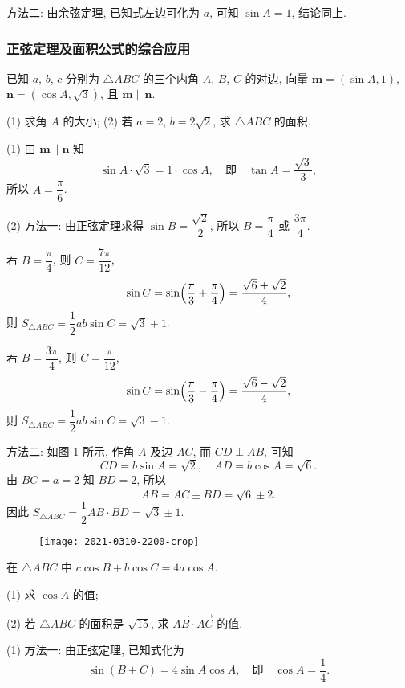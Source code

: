     方法二: 由余弦定理, 
    已知式左边可化为 $a$, 可知 $\sin A=1$, 结论同上.
\endsolution

\subsubsection{正弦定理及面积公式的综合应用}
\begin{example}
    已知 $a$, $b$, $c$ 分别为 $\triangle ABC$ 的三个内角 $A$, $B$, $C$ 的对边, 向量 $\bm{m}=(\sin A,1)$, $\bm{n}=(\cos A, \sqrt3)$, 且 $\bm{m}\parallel \bm{n}$.
    
    (1) 求角 $A$ 的大小;\qquad
    (2) 若 $a=2$, $b=2\sqrt2$, 求 $\triangle ABC$ 的面积.
\end{example}
\beginsolution
    (1) 由 $\bm{m}\parallel \bm{n}$ 知
    \[\sin A\cdot \sqrt3= 1\cdot\cos A,\quad\text{即}\quad
        \tan A= \dfrac{\sqrt3}{3},\]
    所以 $A=\dfrac\pi6$.

    (2) 方法一: 由正弦定理求得 $\sin B= \dfrac{\sqrt2}{2}$, 所以 $B= \dfrac\pi4$ 或 $\dfrac{3\pi}{4}$. 
    
    若 $B= \dfrac\pi4$, 则 $C= \dfrac{7\pi}{12}$,
    \[\sin C= \sin\Bigl(\frac\pi3+ \frac\pi4\Bigr)
        = \frac{\sqrt6+\sqrt2}{4},\]
    则 $S_{\triangle ABC}= \dfrac12 ab\sin C= \sqrt3+1$.
    
    若 $B= \dfrac{3\pi}{4}$, 则 $C= \dfrac{\pi}{12}$,
    \[\sin C= \sin\Bigl(\frac\pi3- \frac\pi4\Bigr)
        = \frac{\sqrt6-\sqrt2}{4},\]
    则 $S_{\triangle ABC}= \dfrac12 ab\sin C= \sqrt3-1$.

    方法二: 如图 \ref{fig:2021-0310-2200} 所示, 作角 $A$ 及边 $AC$, 而 $CD\perp AB$, 可知 
    \[CD= b\sin A= \sqrt2,\quad AD= b\cos A= \sqrt6.\]
    由 $BC= a= 2$ 知 $BD=2$, 所以
    \[AB= AC\pm BD= \sqrt6\pm 2.\]
    因此 $S_{\triangle ABC}= \dfrac12 AB\cdot BD= \sqrt3\pm1$.

    \begin{figure}[hb]
        \small\centering
        \texttt{[image: 2021-0310-2200-crop]}
        \caption{}\label{fig:2021-0310-2200}
    \end{figure}
\endsolution

\lianxi
\begin{exercise}[s]
    在 $\triangle ABC$ 中 $c\cos B+b\cos C=4a\cos A$.
    
    (1) 求 $\cos A$ 的值;
    
    (2) 若 $\triangle ABC$ 的面积是 $\sqrt{15}$, 求 $\overrightarrow{AB}\cdot\overrightarrow{AC}$ 的值.
\end{exercise}
\beginsolution
    (1) 方法一: 由正弦定理, 已知式化为
    \[\sin(B+C)= 4\sin A\cos A,\quad\text{即}\quad
        \cos A= \frac14.\]
    
